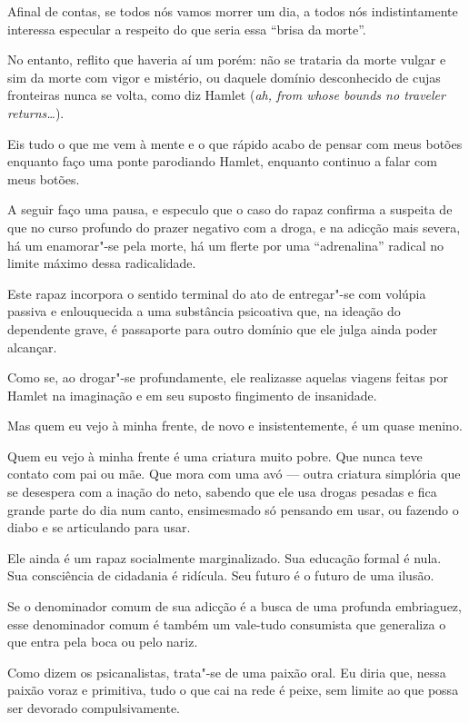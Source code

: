 Afinal de contas, se todos nós vamos morrer um dia, a todos nós
indistintamente interessa especular a respeito do que seria essa ``brisa
da morte''.

No entanto, reflito que haveria aí um porém: não se trataria da morte
vulgar e sim da morte com vigor e mistério, ou daquele domínio
desconhecido de cujas fronteiras nunca se volta, como diz Hamlet
(\emph{ah, from whose bounds no traveler returns…}).

Eis tudo o que me vem à mente e o que rápido acabo de pensar com meus
botões enquanto faço uma ponte parodiando Hamlet, enquanto continuo a
falar com meus botões.

\asterisc{}

A seguir faço uma pausa, e especulo que o caso do rapaz confirma a
suspeita de que no curso profundo do prazer negativo com a droga, e na
adicção mais severa, há um enamorar"-se pela morte, há um flerte por uma
``adrenalina'' radical no limite máximo dessa radicalidade.

Este rapaz incorpora o sentido terminal do ato de entregar"-se com
volúpia passiva e enlouquecida a uma substância psicoativa que, na
ideação do dependente grave, é passaporte para outro domínio que ele
julga ainda poder alcançar.

Como se, ao drogar"-se profundamente, ele realizasse aquelas viagens
feitas por Hamlet na imaginação e em seu suposto fingimento de
insanidade.

\asterisc{}

Mas quem eu vejo à minha frente, de novo e insistentemente, é um quase
menino.

Quem eu vejo à minha frente é uma criatura muito pobre. Que nunca teve
contato com pai ou mãe. Que mora com uma avó --- outra criatura simplória
que se desespera com a inação do neto, sabendo que ele usa drogas
pesadas e fica grande parte do dia num canto, ensimesmado só pensando em
usar, ou fazendo o diabo e se articulando para usar.

Ele ainda é um rapaz socialmente marginalizado. Sua educação formal é
nula. Sua consciência de cidadania é ridícula. Seu futuro é o futuro de
uma ilusão.

Se o denominador comum de sua adicção é a busca de uma profunda
embriaguez, esse denominador comum é também um vale-tudo consumista que
generaliza o que entra pela boca ou pelo nariz.

Como dizem os psicanalistas, trata"-se de uma paixão oral. Eu diria que,
nessa paixão voraz e primitiva, tudo o que cai na rede é peixe, sem
limite ao que possa ser devorado compulsivamente.

